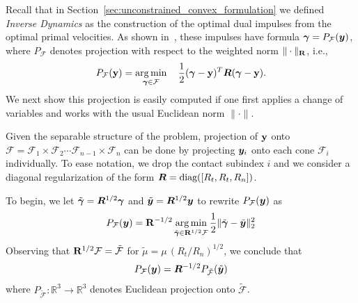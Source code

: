 Recall that in Section~\ref{sec:unconstrained_convex_formulation}
we defined \emph{Inverse Dynamics}
as the construction of the optimal dual impulses
from the optimal primal velocities.  As shown in~\cite{bib:todorov2014},
these impulses have formula ${\bm\gamma} = P_{\mathcal{F}}({\bm{y}})$, 
where $P_{\mathcal{F}}$ denotes projection
with respect to the weighted norm $\|\cdot\|_{{\mathbf{R}}}$, i.e.,
\[
P_{\mathcal{F}}({\mathbf{y}}) = \operatorname*{arg\,min}_{{\bm\gamma}\in\mathcal{F}} \quad \frac{1}{2}({\bm\gamma}-{\mathbf{y}})^T{\bm{R}}({\bm\gamma}-{\mathbf{y}}).
\]
We next show this projection is easily computed
if one first applies a change of variables and works with the usual Euclidean norm $\|\cdot\|$.

Given the separable structure of the problem, projection of ${\mathbf{y}}$ onto $\mathcal{F} =
\mathcal{F}_{1} \times \mathcal{F}_{2} \cdots
\mathcal{F}_{{n-1}}\times\mathcal{F}_{n}$ can be done by projecting ${\bm{y}}_i$ onto each
cone $\mathcal{F}_{i}$ individually. To ease notation, we drop the contact subindex $i$ and we consider a diagonal regularization of the form ${\bm{R}} = \text{diag}([R_t, R_t, R_n])$.

To begin, we let $\tilde{{\bm\gamma}}={\bm{R}}^{1/2}{\bm\gamma}$ and
$\tilde{{\bm{y}}}={\bm{R}}^{1/2}{\bm{y}}$ to rewrite $P_{\mathcal{F}}({\bm{y}})$ as
\[
  P_{\mathcal{F}}({\bm{y}}) = {\mathbf{R}}^{-1/2} \operatorname*{arg\,min}_{\tilde {{\bm\gamma}}\in {\mathbf{R}}^{1/2} \mathcal{F}} \frac{1}{2}\Vert\tilde{{\bm\gamma}}-\tilde{{\bm{y}}} \Vert_2^2
\]                                                                               
Observing that ${\mathbf{R}}^{1/2} \mathcal{F} = \tilde{\mathcal{F}}$ for $\tilde \mu =\mu\,(R_t/R_n)^{1/2}$,
we conclude that
\begin{eqnarray}
  P_\mathcal{F}(\vf{y})=\vf{R}^{-1/2} P_{\tilde{\mathcal{F}}}(\tilde{\vf{y}})
	\label{eq:local_optimization_problem_tilde}
\end{eqnarray}
where $P_{\tilde{\mathcal{F}}} : \mathbb{R}^3 \rightarrow \mathbb{R}^3$ denotes Euclidean projection onto $\tilde{\mathcal{F}}$.

